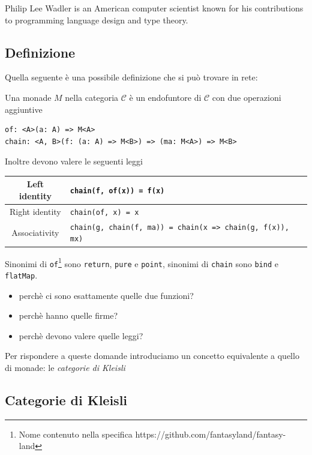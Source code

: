 \documentclass[12pt]{article}
\begin{document}
Philip Lee Wadler is an American computer scientist known for his contributions to programming language design and type theory.

\subsection{Definizione}

Quella seguente è una possibile definizione che si può trovare in rete:

Una monade $M$ nella categoria $\mathcal{C}$ è un endofuntore di $\mathcal{C}$ con due operazioni aggiuntive

\begin{verbatim}
of: <A>(a: A) => M<A>
chain: <A, B>(f: (a: A) => M<B>) => (ma: M<A>) => M<B>
\end{verbatim}

Inoltre devono valere le seguenti leggi

\begin{center}
\bgroup
\def\arraystretch{1.5}
\begin{tabular}{ |c|p{10cm}| }
\hline
Left identity & \texttt{chain(f, of(x)) = f(x)} \\
\hline
Right identity & \texttt{chain(of, x) = x} \\
\hline
Associativity & \texttt{chain(g, chain(f, ma)) = chain(x => chain(g, f(x)), mx)} \\
\hline
\end{tabular}
\egroup
\end{center}

Sinonimi di \texttt{of}\footnote{Nome contenuto nella specifica https://github.com/fantasyland/fantasy-land} sono \texttt{return}, \texttt{pure} e \texttt{point}, sinonimi di \texttt{chain} sono \texttt{bind} e \texttt{flatMap}.

\begin{itemize}
  \item perchè ci sono esattamente quelle due funzioni?
  \item perchè hanno quelle firme?
  \item perchè devono valere quelle leggi?
\end{itemize}

Per rispondere a queste domande introduciamo un concetto equivalente a quello di monade: le \emph{categorie di Kleisli}

\subsection{Categorie di Kleisli}
\end{document}
